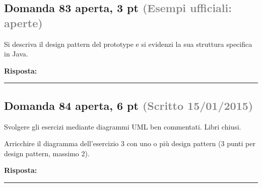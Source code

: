 \documentclass[a4paper,11pt]{article}
\begin{document}
\subsection*{Domanda 83 \hfill {\small aperta, 3 pt \textcolor{gray}{(Esempi ufficiali: aperte)}}}
Si descriva il design pattern del prototype e si evidenzi la sua struttura specifica in Java.

\vspace{0.2cm}
\noindent\textbf{Risposta:}\par
\vspace{4cm}\hrule


\subsection*{Domanda 84 \hfill {\small aperta, 6 pt \textcolor{gray}{(Scritto 15/01/2015)}}}
\begin{tcolorbox}[colback=gray!8,colframe=gray!50,title=Contesto]
Svolgere gli esercizi mediante diagrammi UML ben commentati. Libri chiusi.
\end{tcolorbox}
Arricchire il diagramma dell'esercizio 3 con uno o più design pattern (3 punti per design pattern, massimo 2).

\vspace{0.2cm}
\noindent\textbf{Risposta:}\par
\vspace{4cm}\hrule


\end{document}

